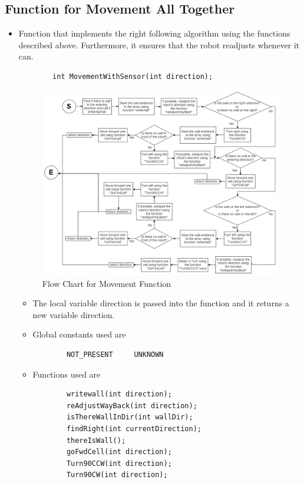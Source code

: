 \documentclass[11pt]{article}
\begin{document}
\subsection{Function for Movement All Together}
\begin{itemize}
\item Function that implements the right following algorithm using the functions described above. Furthermore, it ensures that the robot readjusts whenever it can.
	\begin{verbatim}
		int MovementWithSensor(int direction);
	\end{verbatim}
\begin{figure}[htp]
\centering
\includegraphics[scale=0.45]{images/Software_Flowchart/MovementWithSensor.png}
\caption{Flow Chart for Movement Function}
\label{}
\end{figure}
	\begin{itemize}
	\item The local variable direction is passed into the function and it returns a new variable direction.
	\item Global constants used are
	\begin{verbatim}
		NOT_PRESENT     UNKNOWN
	\end{verbatim}
	\item Functions used are
	\begin{verbatim}
		writewall(int direction);
		reAdjustWayBack(int direction);
		isThereWallInDir(int wallDir);
		findRight(int currentDirection);
		thereIsWall();
		goFwdCell(int direction);
		Turn90CCW(int direction);
		Turn90CW(int direction);
	\end{verbatim}
	\end{itemize}
\end{itemize}
\newpage
\end{document}
